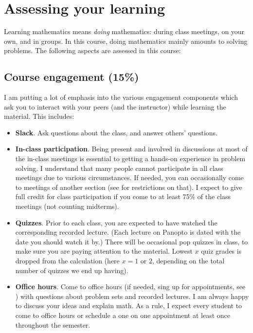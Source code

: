 \documentclass[oneside,11pt]{amsart}
\begin{document}
\section{Assessing your learning}

Learning mathematics means \emph{doing} mathematics: during class meetings, on your own, and in groups.
In this course, doing mathematics mainly amounts to solving problems.
The following aspects are assessed in this course:

\subsection{Course engagement (15\%)}

I am putting a lot of emphasis
into the various engagement components which ask you to interact with 
your peers (and the instructor) while learning the material. This includes:

\begin{itemize}
	\item \textbf{Slack}. Ask questions about the class, and answer others' questions.
	\item \textbf{In-class participation}. 
		Being present and involved in discussions at most of the in-class meetings
		is essential to getting a hands-on experience 
		in problem solving. 
		I understand that many people cannot participate in all class meetings due to various
		circumstances. 
		If needed,
		you can occasionally come to meetings of another section (see 
		for restrictions on that).
		I expect to give full credit for class participation 
		if you come to at least 75\% of the class meetings (not counting midterms).
	\item \textbf{Quizzes}. 
		Prior to each class, you are expected to have watched the corresponding recorded lecture.
		(Each lecture on Panopto is dated with the date you should watch it by.)
		There will be occasional pop quizzes in class,
		to make sure you are paying attention to the material. 
		Lowest $x$ quiz grades is dropped from the calculation (here $x=1$ or $2$, depending
		on the total number of quizzes we end up having).
	\item \textbf{Office hours}. Come to office hours (if needed, 
		sing up for appointments, see ) 
		with questions about problem sets and recorded lectures.
		I am always happy to discuss your ideas and explain math.
		As a rule, I expect every student to come to office hours or schedule a one on one appointment
		at least once throughout the semester.
\end{itemize}
\end{document}
